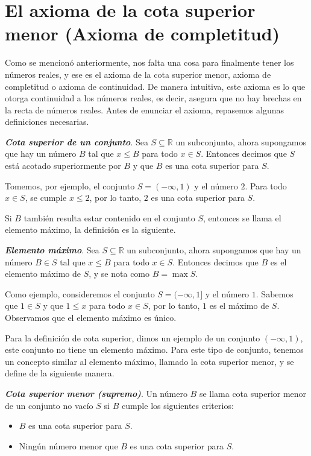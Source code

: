 \documentclass{report}
\begin{document}
    \section{El axioma de la cota superior menor (Axioma de completitud)}

    Como se mencionó anteriormente, nos falta una cosa para finalmente tener los números reales, y ese es el axioma de la cota superior menor, axioma de completitud o axioma de continuidad. De manera intuitiva, este axioma es lo que otorga continuidad a los números reales, es decir, asegura que no hay brechas en la recta de números reales. Antes de enunciar el axioma, repasemos algunas definiciones necesarias.
    
    \begin{defBox}
        \textit{\textbf{Cota superior de un conjunto}}. Sea $S \subseteq \mathbb{R}$ un subconjunto, ahora supongamos que hay un número $B$ tal que $x \leq B$ para todo $x \in S$. Entonces decimos que $S$ está acotado superiormente por $B$ y que $B$ es una cota superior para $S$.
    \end{defBox}
    
    Tomemos, por ejemplo, el conjunto $S = (- \infty, 1)$ y el número $2$. Para todo $x \in S$, se cumple $x \leq 2$, por lo tanto, $2$ es una cota superior para $S$.
    
    Si $B$ también resulta estar contenido en el conjunto $S$, entonces se llama el elemento máximo, la definición es la siguiente.
    
    \begin{defBox}
        \textit{\textbf{Elemento máximo}}. Sea $S \subseteq \mathbb{R}$ un subconjunto, ahora supongamos que hay un número $B \in S$ tal que $x \leq B$ para todo $x \in S$. Entonces decimos que $B$ es el elemento máximo de $S$, y se nota como $B = \max S$.
    \end{defBox}
    
    Como ejemplo, consideremos el conjunto $S = (- \infty, 1]$ y el número $1$. Sabemos que $1 \in S$ y que $1 \leq x$ para todo $x \in S$, por lo tanto, $1$ es el máximo de $S$. Observamos que el elemento máximo es único.
    
    Para la definición de cota superior, dimos un ejemplo de un conjunto $(-\infty, 1)$, este conjunto no tiene un elemento máximo. Para este tipo de conjunto, tenemos un concepto similar al elemento máximo, llamado la cota superior menor, y se define de la siguiente manera.
    
    \begin{defBox}
        \textit{\textbf{Cota superior menor (supremo)}}. Un número $B$ se llama cota superior menor de un conjunto no vacío $S$ si $B$ cumple los siguientes criterios:
    
        \begin{itemize}
            \item $B$ es una cota superior para $S$.
            \item Ningún número menor que $B$ es una cota superior para $S$.
        \end{itemize}
    \end{defBox}
    
\end{document}
